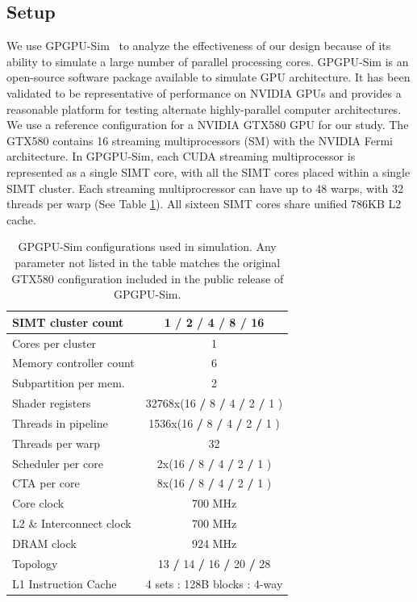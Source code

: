 \subsection{Setup}

We use GPGPU-Sim~\cite{bakhodayuan09} to analyze the effectiveness of our design because of
its ability to simulate a large number of parallel processing cores.
GPGPU-Sim is an open-source software package
available to simulate GPU architecture. 
It has been validated to be representative of performance on NVIDIA
GPUs and provides a reasonable platform for testing alternate
highly-parallel computer architectures. 
We use a reference configuration for a NVIDIA GTX580 GPU for our study.
The GTX580 contains 16 streaming multiprocessors (SM) with the NVIDIA Fermi
architecture. 
In GPGPU-Sim, each CUDA streaming multiprocessor is represented as a
single SIMT core, with all the SIMT cores placed within a single SIMT cluster. 
Each streaming multiprocressor can have up to 48 warps, with 32
threads per warp (See Table \ref{table:gpuconfig}). 
All sixteen SIMT cores share unified 786KB L2 cache. 


\begin{table}[ht]
\caption{GTX580 Configuration in GPGPU-Sim}
\begin{tabular}{l|c}
\hline\hline
SIMT cluster count & 1 \textbf{/} 2 \textbf{/} 4 \textbf{/} 8 \textbf{/} 16  \\
\hline
Cores per cluster & 1 \\
\hline
Memory controller count & 6 \\
\hline
Subpartition per mem. & 2 \\ 
\hline
Shader registers & 32768x(16 \textbf{/} 8 \textbf{/} 4 \textbf{/} 2 \textbf{/} 1 ) \\
\hline
Threads in pipeline & 1536x(16 \textbf{/} 8 \textbf{/} 4 \textbf{/} 2 \textbf{/} 1 ) \\
\hline
Threads per warp & 32 \\
\hline
Scheduler per core & 2x(16 \textbf{/} 8 \textbf{/} 4 \textbf{/} 2 \textbf{/} 1 )\\
\hline
CTA per core & 8x(16 \textbf{/} 8 \textbf{/} 4 \textbf{/} 2 \textbf{/} 1 )\\
\hline
Core clock & 700 MHz\\
\hline
L2 \& Interconnect clock & 700 MHz\\
\hline
DRAM clock & 924 MHz\\
\hline
Topology & 13 \textbf{/} 14 \textbf{/} 16 \textbf{/} 20 \textbf{/} 28 \\
\hline
L1 Instruction Cache & 4 sets : 128B blocks : 4-way \\
\bottomrule[1pt]
\end{tabular}
\caption*{GPGPU-Sim configurations used in simulation. 
Any parameter not listed in the table matches the original GTX580 configuration included in the public release of GPGPU-Sim.}
\label{table:gpuconfig}
\end{table}

